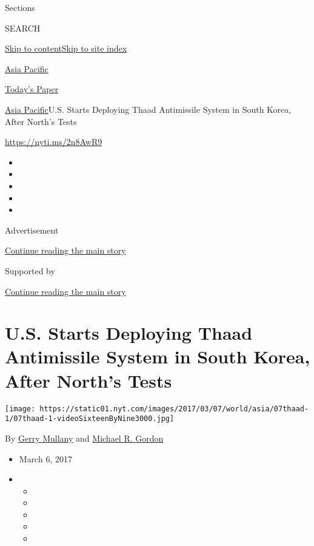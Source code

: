 Sections

SEARCH

\protect\hyperlink{site-content}{Skip to
content}\protect\hyperlink{site-index}{Skip to site index}

\href{https://www.nytimes.com/section/world/asia}{Asia Pacific}

\href{https://myaccount.nytimes.com/auth/login?response_type=cookie\&client_id=vi}{}

\href{https://www.nytimes.com/section/todayspaper}{Today's Paper}

\href{/section/world/asia}{Asia Pacific}\textbar{}U.S. Starts Deploying
Thaad Antimissile System in South Korea, After North's Tests

\url{https://nyti.ms/2n8AwR9}

\begin{itemize}
\item
\item
\item
\item
\item
\end{itemize}

Advertisement

\protect\hyperlink{after-top}{Continue reading the main story}

Supported by

\protect\hyperlink{after-sponsor}{Continue reading the main story}

\hypertarget{us-starts-deploying-thaad-antimissile-system-in-south-korea-after-norths-tests}{%
\section{U.S. Starts Deploying Thaad Antimissile System in South Korea,
After North's
Tests}\label{us-starts-deploying-thaad-antimissile-system-in-south-korea-after-norths-tests}}

\texttt{[image: https://static01.nyt.com/images/2017/03/07/world/asia/07thaad-1/07thaad-1-videoSixteenByNine3000.jpg]}

By \href{http://www.nytimes.com/by/gerry-mullany}{Gerry Mullany} and
\href{http://www.nytimes.com/by/michael-r-gordon}{Michael R. Gordon}

\begin{itemize}
\item
  March 6, 2017
\item
  \begin{itemize}
  \item
  \item
  \item
  \item
  \item
  \end{itemize}
\end{itemize}

